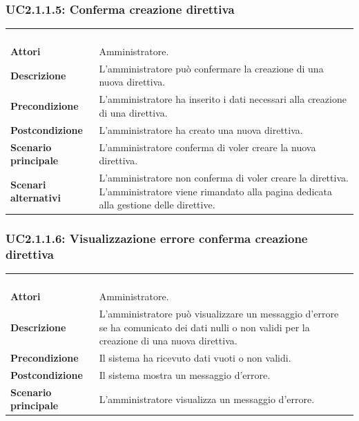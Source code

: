 \subsubsection{UC2.1.1.5: Conferma creazione direttiva}
\label{UC2.1.1.5}
\begin{longtable}{l|p{10cm}}
\rowcolor[gray]{0.8} \multicolumn{2}{c}{} \\
\rowcolor[gray]{0.8} \multicolumn{2}{c}{\textbf{UC2.1.1.5 - Conferma creazione direttiva}} \\
\rowcolor[gray]{0.8} \multicolumn{2}{c}{} \\
\hline
&\\
\textbf{Attori} & Amministratore.\\[7pt]
\textbf{Descrizione} & L'amministratore può confermare la creazione di una nuova direttiva.\\[7pt]
\textbf{Precondizione} & L'amministratore ha inserito i dati necessari alla creazione di una direttiva.\\[7pt]
\textbf{Postcondizione} & L'amministratore ha creato una nuova direttiva.\\[7pt]
\textbf{Scenario principale} &L'amministratore conferma di voler creare la nuova direttiva.\\[7pt]
\textbf{Scenari alternativi} & L'amministratore non conferma di voler creare la direttiva. L'amministratore viene rimandato alla pagina dedicata alla gestione delle direttive.\\[7pt]\hline
\end{longtable}

\subsubsection{UC2.1.1.6: Visualizzazione errore conferma creazione direttiva}
\label{UC2.1.1.6}
\begin{longtable}{l|p{10cm}}
\rowcolor[gray]{0.8} \multicolumn{2}{c}{} \\
\rowcolor[gray]{0.8} \multicolumn{2}{c}{\textbf{UC2.1.1.6 - Visualizzazione errore conferma creazione direttiva}} \\
\rowcolor[gray]{0.8} \multicolumn{2}{c}{} \\
\hline
&\\
\textbf{Attori} & Amministratore.\\[7pt]
\textbf{Descrizione} & L'amministratore può visualizzare un messaggio d'errore se ha comunicato dei dati nulli o non validi per la creazione di una nuova direttiva.\\[7pt]
\textbf{Precondizione} & Il sistema ha ricevuto dati vuoti o non validi.\\[7pt]
\textbf{Postcondizione} & Il sistema mostra un messaggio d'errore.\\[7pt]
\textbf{Scenario principale} &L'amministratore visualizza un messaggio d'errore.\\[7pt]\hline
\end{longtable}

